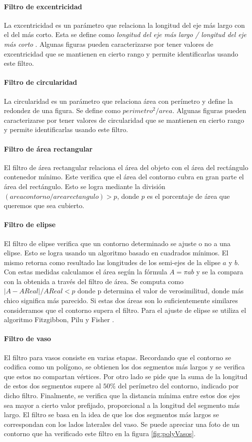 	\paragraph{Filtro de excentricidad}
	La excentricidad es un parámetro que relaciona la longitud del eje más largo con el del más corto. Esta se define como 
	\textit { longitud del eje más largo / longitud del eje más corto}  . Algunas figuras pueden caracterizarse por tener valores de excentricidad
	que se mantienen en cierto rango y permite identificarlas usando este filtro.
	\paragraph{Filtro de circularidad}
	La circularidad es un parámetro que relaciona área con perímetro y define la redondez de una figura. Se define como $perimetro^2/area$. Algunas figuras pueden 
	caracterizarse por tener valores de circularidad que se mantienen en cierto rango y permite identificarlas usando este filtro.
	\paragraph{Filtro de área rectangular}
	El filtro de área rectangular relaciona el área del objeto con el área del rectángulo contenedor mínimo. Este verifica que el área
	del contorno cubra en gran parte el área del rectángulo. Esto se logra mediante la división $(area contorno / area rectangulo)> p$, donde 
	$p$ es el porcentaje de área que queremos que sea cubierto.
	\paragraph{Filtro de elipse}
	El filtro de elipse verifica que un contorno determinado se ajuste o no a una elipse. Esto se logra usando un algoritmo basado 
	en cuadrados mínimos. El mismo retorna como resultado las longitudes de los semi-ejes de la elipse $a$ y $b$. Con estas medidas calculamos
	el área según la fórmula $A=\pi a  b$ y se la compara con la 
	obtenida a través del filtro de área. Se computa como $|A-AReal|/ 
	AReal < p$ donde p determina el
	valor de verosimilitud, donde más chico significa más parecido. Si estas dos áreas son lo suficientemente similares consideramos que el contorno supera el filtro. 
	Para el ajuste de elipse se utiliza el algoritmo Fitzgibbon, Pilu y Fisher \cite{Fitzgibbon99}.
	\paragraph{Filtro de vaso}
	El filtro para vasos consiste en varias etapas. Recordando que el contorno se codifica como un polígono, se obtienen los dos segmentos 
	más largos y se verifica que estos no compartan vértices. Por otro lado se pide que la suma de la longitud de estos dos segmentos supere al $50\%$ del 
	perímetro del contorno, indicado por dicho filtro. Finalmente, se verifica que la distancia mínima entre estos dos ejes sea mayor a cierto valor prefijado, proporcional a la
	longitud del segmento más largo. El filtro se basa en la idea de que 
	los dos segmentos más largos se correspondan con los lados laterales 
	del vaso.  Se puede apreciar una foto  de un contorno que ha 
	verificado este filtro en la figura \ref{fig:polyVasos}. 
